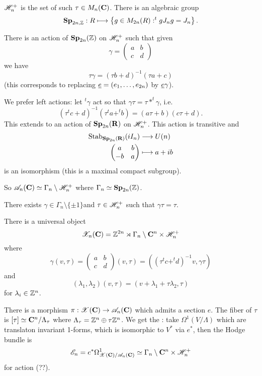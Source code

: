 \begin{definition}
	$\mathscr H_n^{+}$ is the set of such $\tau\in M_n(\mathbf{C})$. There is an algebraic group
	\[
	\Sp_{2n,\Z}:R \mapsto \left\{ g\in M_{2n}(R) : ^{t}gJ_ng = J_n \right\} 
	.\] 
\end{definition}
There is an action of $\mathbf{Sp}_{2n}(\mathbb Z)$ on $\mathscr H_n^{+}$ such that given
\[
	\gamma = \begin{pmatrix} a & b \\ c & d \end{pmatrix} 
\] 
we have
\[
\tau \gamma = (\tau b + d)^{-1}(\tau a + c)
\]
(this corresponds to replacing $\underline{e}=(e_1,\dots,e_{2n})$ by $\underline{e}\gamma$).

We prefer left actions: let $^{t}\gamma$ act so that $\gamma\tau = \tau*^{t}\gamma$, i.e.
\[
	(\tau^{t}c + d)^{-1}(\tau^{t}a+^{t}b) = (a\tau + b)(c\tau + d)
.\] 
This extends to an action of $\mathbf{Sp}_{2n}(\mathbf{R})$ on $\mathscr H_n^{+}$. This action is transitive and
\begin{align*}
	\operatorname{Stab}_{\mathbf{Sp}_{2n}(\mathbf{R})}(iI_n) &\longrightarrow U(n) \\
	\begin{pmatrix} a & b \\ -b & a \end{pmatrix}  &\longmapsto a + ib
\end{align*}
is an isomorphism (this is a maximal compact subgroup).

So $\mathscr{A}_n(\mathbf{C})\simeq \Gamma_n\setminus \mathscr H_n^{+}$ where $\Gamma_n\simeq \mathbf{Sp}_{2n}(\mathbb Z)$.
\begin{remark}
	There exists $\gamma\in \Gamma_n\setminus \{\pm 1\} $and $\tau\in \mathscr H_n^{+}$ such that $\gamma\tau=\tau$.
\end{remark}

There is a universal object
\[
	\mathscr{X}_n(\mathbf{C}) = \mathbb Z^{2n}\rtimes \Gamma_n\setminus\mathbf{C}^{n}\times \mathscr H_n^{+}
\] 
where
\[
	\gamma(v,\tau) = \begin{pmatrix} a & b \\ c & d \end{pmatrix} (v,\tau) = ((\tau^{t}c+^{t}d)^{-1}v, \gamma\tau)
\] 
and
\[
	(\lambda_1,\lambda_2)(v,\tau) = (v+\lambda_1+\tau\lambda_2,\tau)
\]
for $\lambda_i\in \mathbb Z^{n}$.

There is a morphism $\pi:\CX(\C)\to \CA_n(\C)$ which admits a section $e$. The fiber of $\tau$ is $[\tau]\simeq\mathbf{C}^{n} /\Lambda_\tau$ where $\Lambda_\tau = \mathbb Z^{n}\oplus\tau \mathbb Z^{n}$. We get the : take $\Omega^{1}(V /\Lambda)$ which are translaton invariant 1-forms, which is isomorphic to $V^{*}$ via $e^{*}$, then the Hodge bundle is
\[
	\mathscr{E}_n = e^{*}\Omega^{1}_{\mathscr{X}(\mathbf{C}) / \mathscr{A}_n(\mathbf{C})} \simeq \Gamma_n\setminus\mathbf{C}^{n}\times \mathscr H_n^{+}
\]
for action (??).

